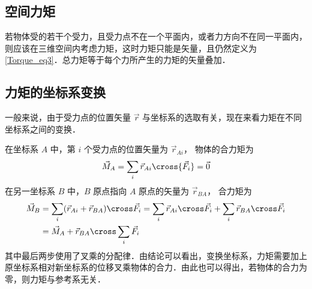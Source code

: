 \subsection{空间力矩}
若物体受的若干个受力，且受力点不在一个平面内，或者力方向不在同一平面内，则应该在三维空间内考虑力矩，这时力矩只能是矢量，且仍然定义为\autoref{Torque_eq3}．总力矩等于每个力所产生的力矩的矢量叠加．

\subsection{力矩的坐标系变换}
一般来说，由于受力点的位置矢量 $\vec r$ 与坐标系的选取有关，现在来看力矩在不同坐标系之间的变换．

在坐标系 $A$ 中，第 $i$ 个受力点的位置矢量为 ${\vec r_{Ai}}$， 物体的合力矩为
\begin{equation}
{\vec M_A} = \sum\limits_i {{{\vec r}_{Ai}} \cross {{\vec F}_i}}  = \vec 0
\end{equation}
在另一坐标系 $B$ 中，$B$ 原点指向 $A$ 原点的矢量为 ${\vec r_{BA}}$， 合力矩为
\begin{equation}\label{Torque_eq5}
\begin{aligned}
\vec M_B &= \sum\limits_i (\vec r_{Ai} + \vec r_{BA}) \cross \vec F_i = \sum\limits_i \vec r_{Ai} \cross \vec F_i + \sum\limits_i \vec r_{BA} \cross \vec F_i \\
&= \vec M_A + \vec r_{BA}\cross \sum\limits_i \vec F_i
\end{aligned}
\end{equation}
其中最后两步使用了叉乘的分配律．由结论可以看出，变换坐标系，力矩需要加上原坐标系相对新坐标系的位移叉乘物体的合力．由此也可以得出，若物体的合力为零，则力矩与参考系无关．



